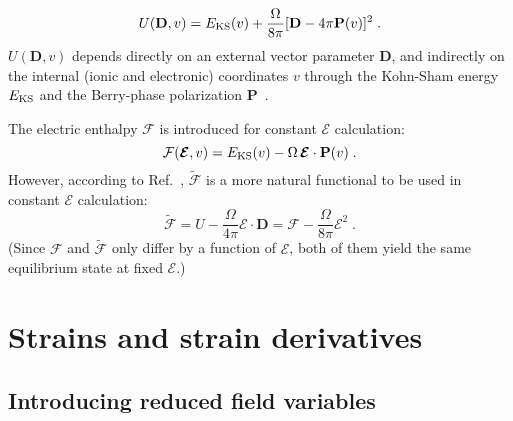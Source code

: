 \documentclass[11pt,fleqn]{article}
\def\E{\mathcal{E}}
\def\EE{\bm{\E}}
\def\F{\mathcal{F}}
\def\Ft{{\widetilde{\F}}}
\begin{document}
\begin{equation}
U(\mathbf{D},v) = E_{\rm KS}(v) +
\frac{\Omega}{8\pi} [ \mathbf{D} - 4\pi \mathbf{P}(v) ]^2 \;.
\label{fixd}
\end{equation}
$U(\mathbf{D},v)$ depends directly on an external vector parameter 
$\mathbf{D}$, and indirectly on the internal (ionic and electronic) 
coordinates $v$ through the Kohn-Sham energy $E_{\rm KS}$ and the 
Berry-phase polarization $\mathbf{P}$~\cite{kv}.

The electric enthalpy $\F$ is introduced for constant $\E$
calculation:~\cite{siv} 
%
\begin{equation}
\mathcal{F}(\bm{\mathcal{E}},v) = E_{\rm KS}(v) - \Omega\, \bm{\mathcal{E}} \cdot \mathbf{P}(v)
\;.
\label{fixe}
\end{equation}
%
However, according to Ref.~\cite{ssv}, $\Ft$ is a more natural
functional to be used in constant $\E$ calculation:
\begin{equation}
\tilde{\mathcal{F}} = U - \frac{\Omega}{4\pi} \EE \cdot \mathbf{D}
                    = \mathcal{F} - \frac{\Omega}{8\pi} \mathcal{E}^2 \;.
\label{fixet}
\end{equation}
%
(Since $\mathcal{F}$ and $\tilde{\mathcal{F}}$ only differ by a function
of $\EE$, both of them yield the same equilibrium state at fixed $\EE$.)

\section{Strains and strain derivatives}

\subsection{Introducing reduced field variables}
\end{document}
